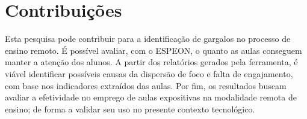\section{Contribuições}
Esta pesquisa pode contribuir para a identificação de gargalos no processo de ensino remoto. É possível avaliar, com o ESPEON, o quanto as aulas conseguem manter a atenção dos alunos. A partir dos relatórios gerados pela ferramenta, é viável identificar possíveis causas da dispersão de foco e falta de engajamento, com base nos indicadores extraídos das aulas. Por fim, os resultados buscam avaliar a efetividade no emprego de aulas expositivas na modalidade remota de ensino; de forma a validar seu uso no presente contexto tecnológico.